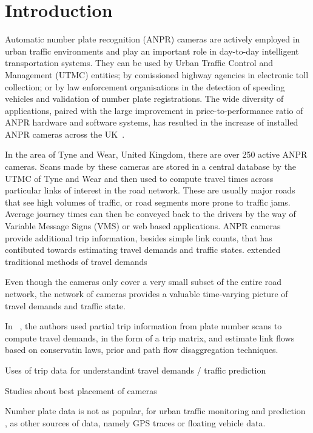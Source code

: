 \section{Introduction}

Automatic number plate recognition (ANPR) cameras are actively employed in urban traffic environments and play an important role in day-to-day intelligent transportation systems. They can be used by Urban Traffic Control and Management (UTMC) entities; by comissioned highway agencies in electronic toll collection; or by law enforcement organisations in the detection of speeding vehicles and validation of number plate registrations. The wide diversity of applications, paired with the large improvement in price-to-performance ratio of ANPR hardware and software systems, has resulted in the increase of installed ANPR cameras across the UK~\cite{SurveyITS2011, EvolutionUTMC2013}.

In the area of Tyne and Wear, United Kingdom, there are over 250 active ANPR cameras. Scans made by these cameras are stored in a central database by the UTMC of Tyne and Wear and then used to compute travel times across particular links of interest in the road network. These are usually major roads that see high volumes of traffic, or road segments more prone to traffic jams. Average journey times can then be conveyed back to the drivers by the way of Variable Message Signs (VMS) or web based applications. ANPR cameras provide additional trip information, besides simple link counts, that has contibuted towards  estimating travel demands and traffic states. extended traditional methods of  travel demands

Even though the cameras only cover a very small subset of the entire road network, the network of cameras provides a valuable time-varying picture of travel demands and traffic state.

In ~\cite{Castillo2008}, the authors used partial trip information from plate number scans to compute travel demands, in the form of a trip matrix, and estimate link flows based on conservatin laws, prior and path flow disaggregation techniques.


Uses of trip data for understandint travel demands / traffic prediction

Studies about best placement of cameras

Number plate data is not as popular, for urban traffic monitoring and prediction , as other sources of data, namely GPS traces or floating vehicle data.

